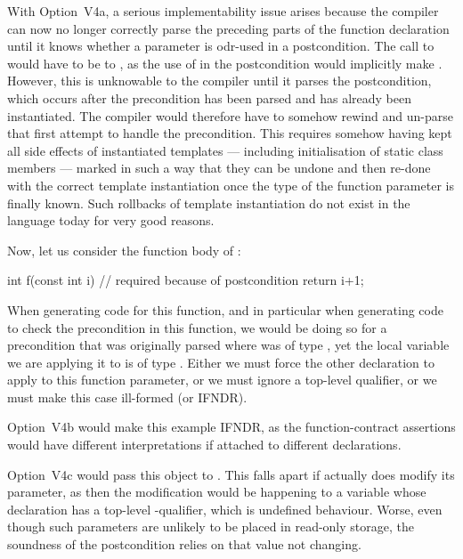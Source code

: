 With Option~V4a, a serious implementability issue arises because the compiler can now no longer correctly parse the preceding parts of the function declaration until it knows whether a parameter is odr-used in a postcondition. The call to  would have to be to , as the use of  in the postcondition would implicitly make  . However, this is unknowable to the compiler until it parses the postcondition, which occurs after the precondition has been parsed and  has already been instantiated. The compiler would therefore have to somehow rewind and un-parse that first attempt to handle the precondition. This  requires somehow having kept all side effects of instantiated templates --- including initialisation of static class members --- marked in such a way that they can be undone and then re-done with the correct template instantiation once the type of the function parameter is finally known. Such rollbacks of template instantiation do not exist in the language today for very good reasons.

Now, let us consider the function body of :
\begin{codeblock}
int f(const int i) { //  required because of postcondition
  return i+1;
}
\end{codeblock}
When generating code for this function, and in particular when generating code to check the precondition in this function, we would be doing so for a precondition that was originally parsed where  was of type , yet the local variable we are applying it to is of type .   Either we must force the other declaration to apply  to this function parameter, or we must ignore a top-level  qualifier, or we must make this case ill-formed (or IFNDR).

Option~V4b would make this example IFNDR, as the function-contract assertions would have different interpretations if attached to different declarations.

Option~V4c would pass this  object to .  This falls apart if  actually does modify its parameter, as then the modification would be happening to a variable whose declaration has a top-level -qualifier, which is undefined behaviour.  Worse, even though such parameters are unlikely to be placed in read-only storage, the soundness of the postcondition relies on that value not changing.


